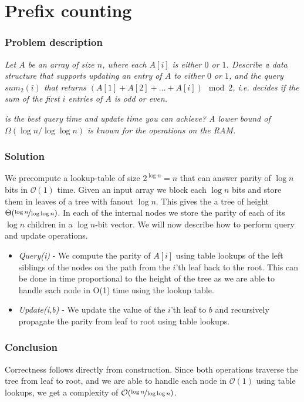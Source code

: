 \documentclass[a4paper,oneside,article,11pt]{memoir}
\begin{document}
\chapter{Prefix counting}
\label{chp:prefix}
\subsection{Problem description}
\textit{Let $A$ be an array of size $n$, where each $A\left[i\right]$ is either $0$ or $1$. Describe a data structure that supports updating an entry of $A$ to either $0$ or $1$, and the query $sum_2\left(i\right)$ that returns $\left(A\left[1\right]+A\left[2\right]+\dots+A\left[i\right]\right) \mod 2$, i.e. decides if the sum of the first $i$ entries of $A$ is odd or even.}

\textit{ is the best query time and update time you can achieve? A lower bound of $\Omega(\log n/\log\log n)$ is known for the operations on the RAM.}

\subsection{Solution}
We precompute a lookup-table of size $2^{\log n} = n$ that can answer parity of $\log n$ bits in $\mathcal{O}(1)$ time. Given an input array we block each $\log n$ bits and store them in leaves of a tree with fanout $\log n$. This gives the a tree of height $\Theta(\nicefrac{\log n}{\log \log n})$. In each of the internal nodes we store the parity of each of its $\log n$ children in a $\log n$-bit vector. We will now describe how to perform query and update operations.

\begin{itemize}
	\item{\textit{Query(i)} - We compute the parity of $A[i]$ using table lookups of the left siblings of the nodes on the path from the $i$'th leaf back to the root. This can be done in time proportional to the height of the tree as we are able to handle each node in O(1) time using the lookup table.}
	\item{\textit{Update(i,b)} - We update the value of the $i$'th leaf to $b$ and recursively propagate the parity from leaf to root using table lookups. }
\end{itemize}

\subsection{Conclusion}
Correctness follows directly from construction. Since both operations traverse the tree from leaf to root, and we are able to handle each node in $\mathcal{O}(1)$ using table lookups, we get a complexity of $\mathcal{O}(\nicefrac{\log n}{\log \log n})$.



\end{document}
